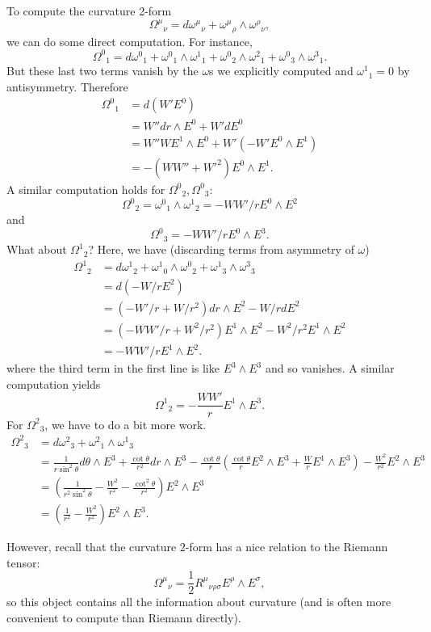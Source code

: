 To compute the curvature 2-form
$$\Omega^\mu{}_\nu=d\omega^\mu{}_\nu+\omega^\mu{}_\rho \wedge \omega^\rho{}_\nu,$$
we can do some direct computation. For instance,
$$\Omega^0{}_1=d\omega^0{}_1+\omega^0{}_1 \wedge \omega^1{}_1 +\omega^0{}_2 \wedge \omega^2{}_1 +\omega^0{}_3 \wedge \omega^3{}_1.$$
But these last two terms vanish by the $\omega$s we explicitly computed and $\omega^1{}_1=0$ by antisymmetry. Therefore
\begin{align*}
    \Omega^0{}_1&= d(W'E^0)\\
    &=W'' dr \wedge E^0 + W'dE^0\\
    &=W'' W E^1\wedge E^0 +W'(-W' E^0 \wedge E^1)\\
    &=-(WW''+{W'}^2)E^0 \wedge E^1.
\end{align*}
A similar computation holds for $\Omega^0{}_2,\Omega^0{}_3$:
$$\Omega^0{}_2 = \omega^0{}_1 \wedge \omega^1{}_2 = -WW'/r E^0 \wedge E^2$$
and
$$\Omega^0{}_3=-WW'/r E^0 \wedge E^3.$$
What about $\Omega^1{}_2$? Here, we have (discarding terms from asymmetry of $\omega$)
\begin{align*}
    \Omega^1{}_2&= d\omega^1{}_2+\omega^1{}_0 \wedge \omega^0{}_2 + \omega^1{}_3 \wedge \omega^3{}_3\\
    &= d(-W/r E^2)\\
    &=(-W'/r+W/r^2) dr \wedge E^2 -W/r dE^2\\
    &=(-WW'/r + W^2/r^2)E^1 \wedge E^2 -W^2/r^2 E^1 \wedge E^2\\
    &=-WW'/r E^1 \wedge E^2.
\end{align*}
where the third term in the first line is like $E^3\wedge E^3$ and so vanishes.
A  similar computation yields
$$\Omega^1{}_2 = -\frac{WW'}{r} E^1 \wedge E^3.$$
For $\Omega^2{}_3$, we have to do a bit more work.
%
\begin{align*}
    \Omega^2{}_3 &= d\omega^2{}_3 +\omega^2{}_1 \wedge \omega^1{}_3\\
    &=\frac{1}{r\sin^2\theta}d\theta \wedge E^3 + \frac{\cot\theta}{r^2}dr \wedge E^3 -\frac{\cot\theta}{r}\left(\frac{\cot\theta}{r}E^2 \wedge E^3 +\frac{W}{r} E^1 \wedge E^3\right) -\frac{W^2}{r^2}E^2 \wedge E^3\\
    &=\left(\frac{1}{r^2 \sin^2\theta}-\frac{W^2}{r^2}-\frac{\cot^2\theta}{r^2}\right)E^2\wedge E^3\\
    &=\left(\frac{1}{r^2}-\frac{W^2}{r^2}\right) E^2 \wedge E^3.
\end{align*}

However, recall that the curvature $2$-form has a nice relation to the Riemann tensor:
$$\Omega^\mu{}_\nu=\frac{1}{2}R^\mu{}_{\nu\rho\sigma}E^\rho \wedge E^\sigma,$$
so this object contains all the information about curvature (and is often more convenient to compute than Riemann directly).

